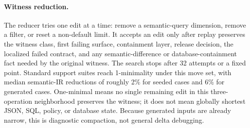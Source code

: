 \paragraph{Witness reduction.}
The reducer tries one edit at a time: remove a semantic-query dimension, remove a filter, or reset a non-default limit. It accepts an edit only after replay preserves the witness class, first failing surface, containment layer, release decision, the localized failed contract, and any semantic-difference or database-containment fact needed by the original witness. The search stops after 32 attempts or a fixed point. Standard support suites reach 1-minimality under this move set, with median semantic-IR reductions of roughly 2\% for seeded cases and 6\% for generated cases. One-minimal means no single remaining edit in this three-operation neighborhood preserves the witness; it does not mean globally shortest JSON, SQL, policy, or database state. Because generated inputs are already narrow, this is diagnostic compaction, not general delta debugging.
